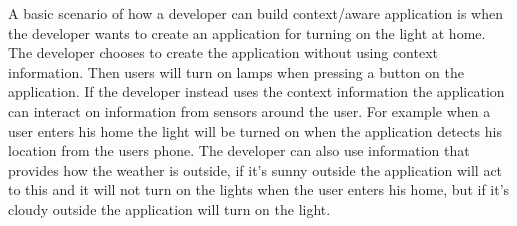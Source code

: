 A basic scenario of how a developer can build context\slash aware application is when the developer wants to create an application for turning on the light at home. The developer chooses to create the application without using context information. Then users will turn on lamps when pressing a button on the application. If the developer instead uses the context information the application can interact on information from sensors around the user. For example when a user enters his home the light will be turned on when the application detects his location from the users phone. The developer can also use information that provides how the weather is outside, if it's sunny outside the application will act to this and it will not turn on the lights when the user enters his home, but if it's cloudy outside the application will turn on the light.
